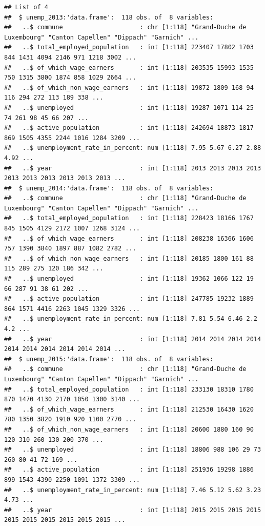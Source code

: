 \documentclass[]{gitbook}
\begin{document}
\begin{verbatim}
## List of 4
##  $ unemp_2013:'data.frame':  118 obs. of  8 variables:
##   ..$ commune                     : chr [1:118] "Grand-Duche de Luxembourg" "Canton Capellen" "Dippach" "Garnich" ...
##   ..$ total_employed_population   : int [1:118] 223407 17802 1703 844 1431 4094 2146 971 1218 3002 ...
##   ..$ of_which_wage_earners       : int [1:118] 203535 15993 1535 750 1315 3800 1874 858 1029 2664 ...
##   ..$ of_which_non_wage_earners   : int [1:118] 19872 1809 168 94 116 294 272 113 189 338 ...
##   ..$ unemployed                  : int [1:118] 19287 1071 114 25 74 261 98 45 66 207 ...
##   ..$ active_population           : int [1:118] 242694 18873 1817 869 1505 4355 2244 1016 1284 3209 ...
##   ..$ unemployment_rate_in_percent: num [1:118] 7.95 5.67 6.27 2.88 4.92 ...
##   ..$ year                        : int [1:118] 2013 2013 2013 2013 2013 2013 2013 2013 2013 2013 ...
##  $ unemp_2014:'data.frame':  118 obs. of  8 variables:
##   ..$ commune                     : chr [1:118] "Grand-Duche de Luxembourg" "Canton Capellen" "Dippach" "Garnich" ...
##   ..$ total_employed_population   : int [1:118] 228423 18166 1767 845 1505 4129 2172 1007 1268 3124 ...
##   ..$ of_which_wage_earners       : int [1:118] 208238 16366 1606 757 1390 3840 1897 887 1082 2782 ...
##   ..$ of_which_non_wage_earners   : int [1:118] 20185 1800 161 88 115 289 275 120 186 342 ...
##   ..$ unemployed                  : int [1:118] 19362 1066 122 19 66 287 91 38 61 202 ...
##   ..$ active_population           : int [1:118] 247785 19232 1889 864 1571 4416 2263 1045 1329 3326 ...
##   ..$ unemployment_rate_in_percent: num [1:118] 7.81 5.54 6.46 2.2 4.2 ...
##   ..$ year                        : int [1:118] 2014 2014 2014 2014 2014 2014 2014 2014 2014 2014 ...
##  $ unemp_2015:'data.frame':  118 obs. of  8 variables:
##   ..$ commune                     : chr [1:118] "Grand-Duche de Luxembourg" "Canton Capellen" "Dippach" "Garnich" ...
##   ..$ total_employed_population   : int [1:118] 233130 18310 1780 870 1470 4130 2170 1050 1300 3140 ...
##   ..$ of_which_wage_earners       : int [1:118] 212530 16430 1620 780 1350 3820 1910 920 1100 2770 ...
##   ..$ of_which_non_wage_earners   : int [1:118] 20600 1880 160 90 120 310 260 130 200 370 ...
##   ..$ unemployed                  : int [1:118] 18806 988 106 29 73 260 80 41 72 169 ...
##   ..$ active_population           : int [1:118] 251936 19298 1886 899 1543 4390 2250 1091 1372 3309 ...
##   ..$ unemployment_rate_in_percent: num [1:118] 7.46 5.12 5.62 3.23 4.73 ...
##   ..$ year                        : int [1:118] 2015 2015 2015 2015 2015 2015 2015 2015 2015 2015 ...

\end{verbatim}
\end{document}
